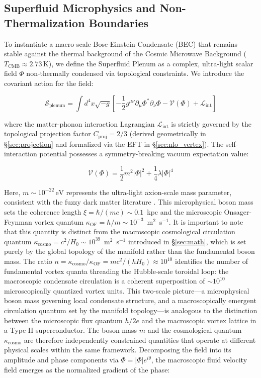 \documentclass[aps,prd,10pt,twocolumn,superscriptaddress,nofootinbib,floatfix]{revtex4-2}
\begin{document}
\subsection{\label{sec:microphysics}Superfluid Microphysics and Non-Thermalization Boundaries}

To instantiate a macro-scale Bose-Einstein Condensate (BEC) that remains stable against the thermal background of the Cosmic Microwave Background ($T_{\text{CMB}} \approx 2.73\,\text{K}$), we define the Superfluid Plenum as a complex, ultra-light scalar field $\Phi$ non-thermally condensed via topological constraints. We introduce the covariant action for the field:

\begin{equation}
\mathcal{S}_{\text{plenum}} = \int d^4x \sqrt{-g} \left[ -\frac{1}{2} g^{\mu\nu} \partial_\mu \Phi^* \partial_\nu \Phi - \mathcal{V}(\Phi) + \mathcal{L}_{\text{int}} \right]
\end{equation}

where the matter-phonon interaction Lagrangian $\mathcal{L}_{\text{int}}$ is strictly governed by the topological projection factor $C_{\text{proj}} = 2/3$ (derived geometrically in \S\ref{sec:projection} and formalized via the EFT in \S\ref{sec:nlo_vertex}). The self-interaction potential possesses a symmetry-breaking vacuum expectation value:

\begin{equation}
\mathcal{V}(\Phi) = \frac{1}{2} m^2 |\Phi|^2 + \frac{1}{4} \lambda |\Phi|^4
\end{equation}

Here, $m \sim 10^{-22}\,\text{eV}$ represents the ultra-light axion-scale mass parameter, consistent with the fuzzy dark matter literature \cite{hui_ultralight}. This microphysical boson mass sets the coherence length $\xi = \hbar/(mc) \sim 0.1$~kpc and the microscopic Onsager-Feynman vortex quantum $\kappa_{\text{OF}} = h/m \sim 10^{-3}$~m$^2$~s$^{-1}$. It is important to note that this quantity is distinct from the macroscopic cosmological circulation quantum $\kappa_{\text{cosmo}} = c^2/H_0 \sim 10^{39}$~m$^2$~s$^{-1}$ introduced in \S\ref{sec:math}, which is set purely by the global topology of the manifold rather than the fundamental boson mass. The ratio $n = \kappa_{\text{cosmo}}/\kappa_{\text{OF}} = mc^2/(hH_0) \approx 10^{10}$ identifies the number of fundamental vortex quanta threading the Hubble-scale toroidal loop: the macroscopic condensate circulation is a coherent superposition of $\sim 10^{10}$ microscopically quantized vortex units. This two-scale picture---a microphysical boson mass governing local condensate structure, and a macroscopically emergent circulation quantum set by the manifold topology---is analogous to the distinction between the microscopic flux quantum $h/2e$ and the macroscopic vortex lattice in a Type-II superconductor. The boson mass $m$ and the cosmological quantum $\kappa_{\text{cosmo}}$ are therefore independently constrained quantities that operate at different physical scales within the same framework. Decomposing the field into its amplitude and phase components via $\Phi = |\Phi|e^{i\theta}$, the macroscopic fluid velocity field emerges as the normalized gradient of the phase:
\end{document}
